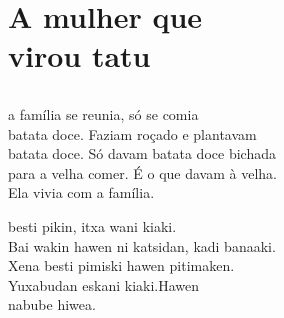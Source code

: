 \openany

\blankpage
\part[A mulher que virou tatu]{A mulher que\\ virou tatu}

\chapter*{}

\mbox{}\vspace*{\fill}


 a família se reunia, só se comia\\
batata doce. Faziam roçado e plantavam\\
batata doce. Só davam batata doce bichada\\
para a velha comer. É o que davam à velha.\\
Ela vivia com a família.

\vspace{2em}


 besti pikin, itxa wani kiaki.\\
Bai wakin hawen ni katsidan, kadi banaaki.\\
Xena besti pimiski hawen pitimaken.\\
Yuxabudan eskani kiaki.Hawen\\
nabube hiwea.

\vspace*{\fill}


